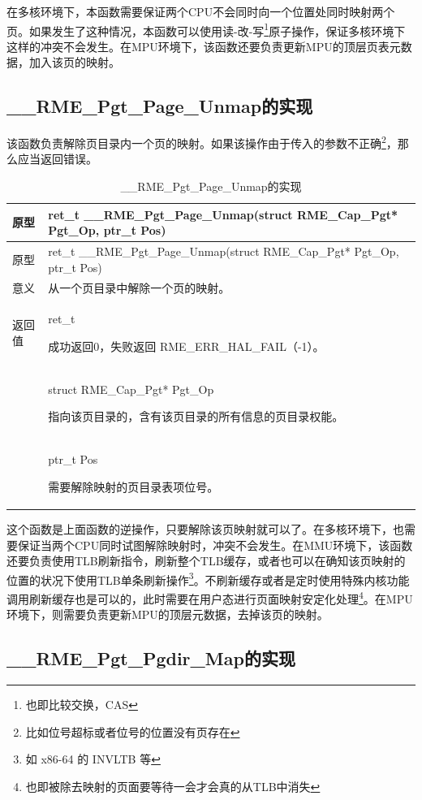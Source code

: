 在多核环境下，本函数需要保证两个CPU不会同时向一个位置处同时映射两个页。如果发生了这种情况，本函数可以使用读-改-写\footnote{也即比较交换，CAS}原子操作，保证多核环境下这样的冲突不会发生。在MPU环境下，该函数还要负责更新MPU的顶层页表元数据，加入该页的映射。

\subsection{\_\_RME\_Pgt\_Page\_Unmap的实现}\label{subsec:7-rme-pgt-page-unmap-implementation}

该函数负责解除页目录内一个页的映射。如果该操作由于传入的参数不正确\footnote{比如位号超标或者位号的位置没有页存在}，那么应当返回错误。

\begin{xltabular}{\textwidth}{@{}>{\hsize\raggedright\arraybackslash}X>{\hsize\raggedright\arraybackslash}X@{}}
\caption{\_\_RME\_Pgt\_Page\_Unmap的实现}\label{tab:7-80-rme-pgt-page-unmap-implementation}\\
\toprule
原型 & ret\_t \_\_RME\_Pgt\_Page\_Unmap(struct RME\_Cap\_Pgt* Pgt\_Op,
ptr\_t Pos)\tabularnewline
\endfirsthead
\toprule
原型 & ret\_t \_\_RME\_Pgt\_Page\_Unmap(struct RME\_Cap\_Pgt* Pgt\_Op,
ptr\_t Pos)\tabularnewline
\midrule
\endhead
\bottomrule
\endlastfoot
意义 & 从一个页目录中解除一个页的映射。\tabularnewline
返回值\strut
 & ret\_t

成功返回0，失败返回 RME\_ERR\_HAL\_FAIL（-1）。\strut
\tabularnewline
{} & struct RME\_Cap\_Pgt* Pgt\_Op

指向该页目录的，含有该页目录的所有信息的页目录权能。\strut
\tabularnewline
\strut
 & ptr\_t Pos

需要解除映射的页目录表项位号。\strut
\tabularnewline
\end{xltabular}

这个函数是上面函数的逆操作，只要解除该页映射就可以了。在多核环境下，也需要保证当两个CPU同时试图解除映射时，冲突不会发生。在MMU环境下，该函数还要负责使用TLB刷新指令，刷新整个TLB缓存，或者也可以在确知该页映射的位置的状况下使用TLB单条刷新操作\footnote{如 x86-64 的 INVLTB 等}。不刷新缓存或者是定时使用特殊内核功能调用刷新缓存也是可以的，此时需要在用户态进行页面映射安定化处理\footnote{也即被除去映射的页面要等待一会才会真的从TLB中消失}。在MPU环境下，则需要负责更新MPU的顶层元数据，去掉该页的映射。

\subsection{\_\_RME\_Pgt\_Pgdir\_Map的实现}\label{subsec:7-rme-pgt-pgdir-map-implementation}

